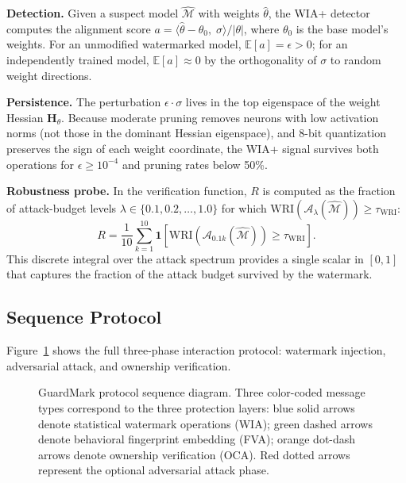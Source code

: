 \documentclass[journal,compsoc]{IEEEtran}
\newcommand{\M}{\mathcal{M}}
\newcommand{\WRI}{\mathrm{WRI}}
\begin{document}
\textbf{Detection.} Given a suspect model $\hat{\M}$ with weights
$\hat{\theta}$, the WIA+ detector computes the alignment score
$a = \langle \hat{\theta} - \theta_0,\; \sigma \rangle / |\theta|$,
where $\theta_0$ is the base model's weights. For an unmodified watermarked
model, $\mathbb{E}[a] = \epsilon > 0$; for an independently trained model,
$\mathbb{E}[a] \approx 0$ by the orthogonality of $\sigma$ to random
weight directions.

\textbf{Persistence.} The perturbation $\epsilon \cdot \sigma$ lives in
the top eigenspace of the weight Hessian $\mathbf{H}_\theta$. Because
moderate pruning removes neurons with low activation norms (not those
in the dominant Hessian eigenspace), and 8-bit quantization preserves
the sign of each weight coordinate, the WIA+ signal survives both
operations for $\epsilon \geq 10^{-4}$ and pruning rates below 50\%.

\textbf{Robustness probe.} In the verification function, $R$ is computed as
the fraction of attack-budget levels $\lambda \in \{0.1, 0.2, \ldots, 1.0\}$
for which $\WRI(\mathcal{A}_\lambda(\hat{\M})) \geq \tau_{\WRI}$:
\begin{equation}
  R = \frac{1}{10}\sum_{k=1}^{10}
      \mathbf{1}\!\left[\WRI\!\left(\mathcal{A}_{0.1k}(\hat{\M})\right)
      \geq \tau_{\WRI}\right].
  \label{eq:robustness}
\end{equation}
This discrete integral over the attack spectrum provides a single
scalar in $[0,1]$ that captures the fraction of the attack budget
survived by the watermark.

\subsection{Sequence Protocol}

Figure~\ref{fig:sequence} shows the full three-phase interaction protocol:
watermark injection, adversarial attack, and ownership verification.

\begin{figure}[t]
\caption{GuardMark protocol sequence diagram. Three color-coded message types
  correspond to the three protection layers: blue solid arrows denote
  statistical watermark operations (WIA); green dashed arrows denote
  behavioral fingerprint embedding (FVA); orange dot-dash arrows denote
  ownership verification (OCA). Red dotted arrows represent the optional
  adversarial attack phase.}
\label{fig:sequence}
\centering
\resizebox{\columnwidth}{!}{}
\end{figure}
\end{document}
